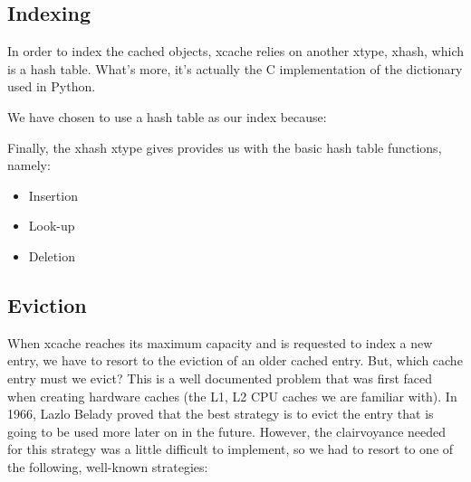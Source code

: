 \subsection{Indexing}

In order to index the cached objects, xcache relies on another xtype, xhash, 
which is a hash table. What's more, it's actually the C implementation of the 
dictionary used in Python.

We have chosen to use a hash table as our index because:


Finally, the xhash xtype gives provides us with the basic hash table functions, 
namely:

\begin{itemize}
	\item Insertion
	\item Look-up
	\item Deletion
\end{itemize}

\subsection{Eviction}

When xcache reaches its maximum capacity and is requested to index a new entry, 
we have to resort to the eviction of an older cached entry. But, which cache 
entry must we evict? This is a well documented problem that was first faced when 
creating hardware caches (the L1, L2 CPU caches we are familiar with). In 1966, 
Lazlo Belady proved that the best strategy is to evict the entry that is going 
to be used more later on in the future\cite{Belady}. However, the clairvoyance 
needed for this strategy was a little difficult to implement, so we had to 
resort to one of the following, well-known strategies:


